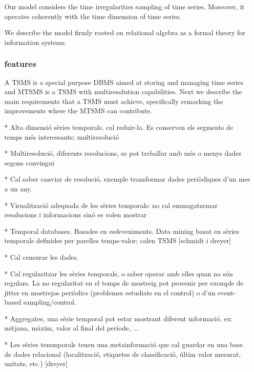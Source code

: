 \item Our model considers the time irregularities sampling of time
  series. Moreover, it operates coherently with the time dimension of
  time series.

\item We describe the model firmly rooted on relational algebra as a formal
  theory for information systems.



\subsubsection{features}

A TSMS is a special purpose DBMS aimed at storing and managing time
series and MTSMS is a TSMS with multiresolution capabilities. Next we
describe the main requirements that a TSMS must achieve, specifically
remarking the improvements where the MTSMS can contribute.



* Alta dimensió sèries temporals, cal reduir-la. Es conserven els segments de temps més interessants; multiresolució


* Multiresolució, diferents resolucions, es pot treballar amb més o menys dades segons convingui

* Cal saber canviar de resolució, exemple transformar dades periòdiques d'un mes a un any.

* Visualització adequada de les sèries temporals: no cal emmagatzemar resolucions i informacions sinó es volen mostrar


* Temporal databases. Basades en esdeveniments. Data mining basat en sèries temporals definides per parelles temps-valor; calen TSMS [schmidt i dreyer] 



* Cal censurar les dades.

* Cal regularitzar les sèries temporals, o saber operar amb elles quan no són regulars. La no regularitat en el temps de mostreig pot provenir per exemple de jitter en mostrejos periòdics (problemes estudiats en el control) o d'un event-based sampling/control.


* Aggregates, una sèrie temporal pot estar mostrant diferent informació. ex: mitjana, màxim, valor al final del període, ...

* Les sèries temmporals tenen una metainformació que cal guardar en una base de dades relacional (localització, etiquetes de classificació, últim valor mesurat, unitats, etc.) [dreyer]




